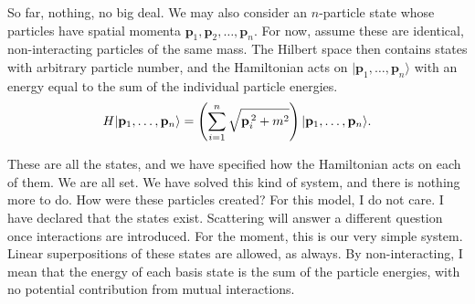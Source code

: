 So far, nothing, no big deal. We may also consider an $n$-particle state whose
particles have spatial momenta $\mathbf p_1,\mathbf p_2,\ldots,\mathbf p_n$.
For now, assume these are identical, non-interacting particles of the same mass.
The Hilbert space then contains states with arbitrary particle number, and the
Hamiltonian
acts on $|\mathbf p_1,\ldots,\mathbf p_n\rangle$ with an energy equal to the sum
of the individual particle energies.
\begin{equation}
  H\lvert \mathbf p_1,\ldots,\mathbf p_n\rangle
  =\left(\sum_{i=1}^{n}\sqrt{\mathbf p_i^{\,2}+m^2}\right)
   \lvert \mathbf p_1,\ldots,\mathbf p_n\rangle.
  \label{eq:253a-multiparticle-energy}
\end{equation}

These are all the states, and we have specified how the Hamiltonian acts on each
of them. We are all set. We have solved this kind of system, and there is
nothing more to do.
How were these particles created? For this model, I do not care. I have declared
that the states exist. Scattering will answer a different question once
interactions are introduced. For the moment, this is our very simple system.
Linear superpositions of these states are allowed, as always. By
non-interacting, I mean that the energy of each basis state is the sum of the
particle energies, with no potential contribution from mutual interactions.

